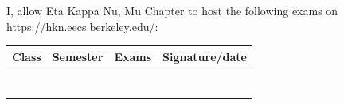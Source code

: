 \documentclass[10pt]{article}
\begin{document}
\setlength{\parindent}{0em}
I, \underline{\hspace{25em}} allow Eta Kappa Nu, Mu Chapter to host the
following exams on https://hkn.eecs.berkeley.edu/:

\vspace{3em}
\begin{tabular}{llll}
  Class & Semester & Exams & Signature/date \\
  \hline & & & \\

  \vspace{2em}
  \underline{\hspace{7em}} & \underline{\hspace{7em}} &
  \underline{\hspace{15em}} & \underline{\hspace{15em}} \\

  \vspace{2em}
  \underline{\hspace{7em}} & \underline{\hspace{7em}} &
  \underline{\hspace{15em}} & \underline{\hspace{15em}} \\

  \vspace{2em}
  \underline{\hspace{7em}} & \underline{\hspace{7em}} &
  \underline{\hspace{15em}} & \underline{\hspace{15em}} \\

  \vspace{2em}
  \underline{\hspace{7em}} & \underline{\hspace{7em}} &
  \underline{\hspace{15em}} & \underline{\hspace{15em}} \\

  \vspace{2em}
  \underline{\hspace{7em}} & \underline{\hspace{7em}} &
  \underline{\hspace{15em}} & \underline{\hspace{15em}} \\

  \vspace{2em}
  \underline{\hspace{7em}} & \underline{\hspace{7em}} &
  \underline{\hspace{15em}} & \underline{\hspace{15em}} \\


\end{tabular}
\end{document}
